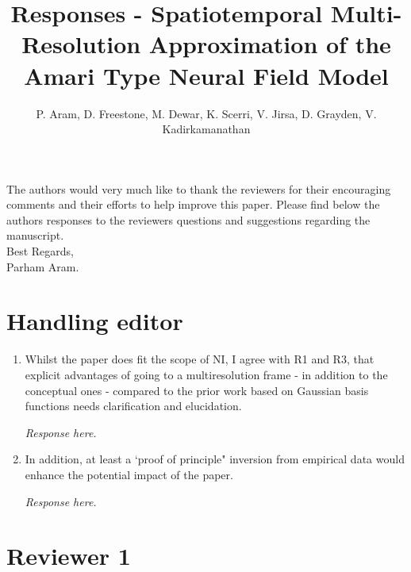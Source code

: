 \documentclass{article}
\title{Responses - Spatiotemporal Multi-Resolution Approximation of the Amari Type Neural Field Model}
\author{ P. Aram, D. Freestone, M. Dewar, K. Scerri, V. Jirsa, D. Grayden, V. Kadirkamanathan}
\begin{document}
    \maketitle

    The authors would very much like to thank the reviewers for their encouraging comments and their efforts to help improve this paper. Please find below the authors responses to the reviewers questions and suggestions regarding the manuscript. 
\\

Best Regards,
\\

Parham Aram.

\section{Handling editor}
\begin{enumerate}
\item Whilst the paper does fit the scope of NI, I agree with R1 and R3, that explicit advantages of going to a multiresolution frame - in addition to the conceptual ones - compared to the prior work based on Gaussian basis functions needs clarification and elucidation. 

\emph{Response here.}

\item  In addition, at least a `proof of principle" inversion from empirical data would enhance the potential impact of the paper. 

\emph{Response here.}
	
\end{enumerate}

    \section{Reviewer 1}
    
\end{document}
